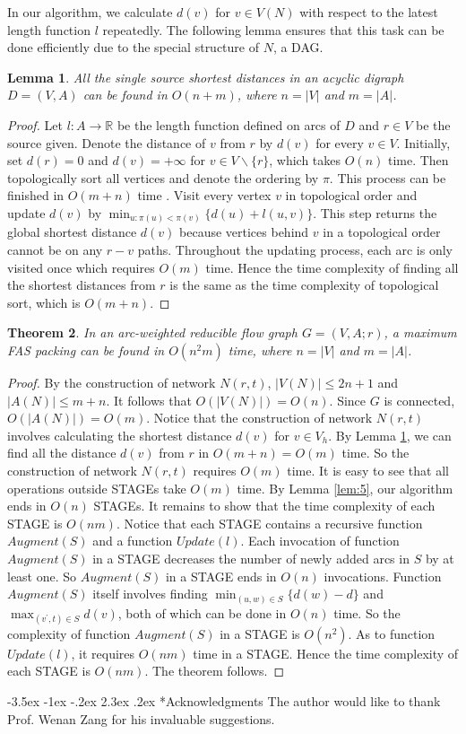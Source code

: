 \documentclass[11pt]{article}
\makeatletter
\newtheorem{theorem}{Theorem}[section]
\newtheorem{lemma}[theorem]{Lemma}
\renewcommand\section{%
  \@startsection{section}{1}
                {\z@}%
                {-3.5ex \@plus -1ex \@minus -.2ex}%
                {2.3ex \@plus.2ex}%
                {\large\bfseries}%
}
\makeatother
\begin{document}
In our algorithm, we calculate $d(v)$ for $v\in V(N)$ with respect to the latest length function $l$ repeatedly. The following lemma ensures that this task can be done efficiently due to the special structure of $N$, a DAG.

\begin{lemma}
\label{lem:6}
All the single source shortest distances in an acyclic digraph $D=(V,A)$ can be found in $O(n+m)$, where $n=\lvert V \rvert$ and $m=\lvert A \rvert$.
\end{lemma}
\begin{proof}
Let $l:A\rightarrow \mathbb{R}$ be the length function defined on arcs of $D$ and $r\in V$ be the source given. Denote the distance of $v$ from $r$ by $d(v)$ for every $v\in V$. Initially, set $d(r)=0$ and $d(v)=+\infty$ for $v\in V\backslash \{r\}$, which takes $O(n)$ time. Then topologically sort all vertices and denote the ordering by $\pi$. This process can be finished in $O(m+n)$ time \cite{AhMO}. Visit every vertex $v$ in topological order and update $d(v)$ by $\min_{u:\pi(u)<\pi(v)}\{d(u)+l(u,v)\}$. This step returns the global shortest distance $d(v)$ because vertices behind $v$ in a topological order cannot be on any $r-v$ paths. Throughout the updating process, each arc is only visited once which requires $O(m)$ time. Hence the time complexity of finding all the shortest distances from $r$ is the same as the time complexity of topological sort, which is $O(m+n)$.
\end{proof}

\begin{theorem}
\label{thm:5}
In an arc-weighted reducible flow graph $G=(V,A;r)$, a maximum FAS packing can be found in $O(n^2 m)$ time, where $n=\lvert V \rvert$ and $m=\lvert A \rvert$.
\end{theorem}
\begin{proof}
By the construction of network $N(r,t)$, $\lvert V(N)\rvert\leq 2n+1$ and $\lvert A(N)\rvert\leq m+n$. It follows that $O(\lvert V(N)\rvert)=O(n)$. Since $G$ is connected, $O(\lvert A(N)\rvert)=O(m)$. Notice that the construction of network $N(r,t)$ involves calculating the shortest distance $d(v)$ for $v\in V_h$. By Lemma \ref{lem:6}, we can find all the distance $d(v)$ from $r$ in $O(m+n)=O(m)$ time. So the construction of network $N(r,t)$ requires $O(m)$ time. It is easy to see that all operations outside STAGEs take $O(m)$ time. By Lemma \ref{lem:5}, our algorithm ends in $O(n)$ STAGEs. It remains to show that the time complexity of each STAGE is $O(nm)$. Notice that each STAGE contains a recursive function $Augment(S)$ and a function $Update(l)$. Each invocation of function $Augment(S)$ in a STAGE decreases the number of newly added arcs in $S$ by at least one. So $Augment(S)$ in a STAGE ends in $O(n)$ invocations. Function $Augment(S)$ itself involves finding $\min_{(u,w)\in S}\{d(w)-d\}$ and $\max_{(v^\prime,t)\in S} d(v)$, both of which can be done in $O(n)$ time. So the complexity of function $Augment(S)$ in a STAGE is $O(n^2)$. As to function $Update(l)$, it requires $O(nm)$ time in a STAGE. Hence the time complexity of each STAGE is $O(nm)$. The theorem follows.
\end{proof}

\section*{Acknowledgments}
The author would like to thank Prof. Wenan Zang for his invaluable suggestions.



\nocite{CDHZ,DinZ,HecU2,Sham}
\end{document}
